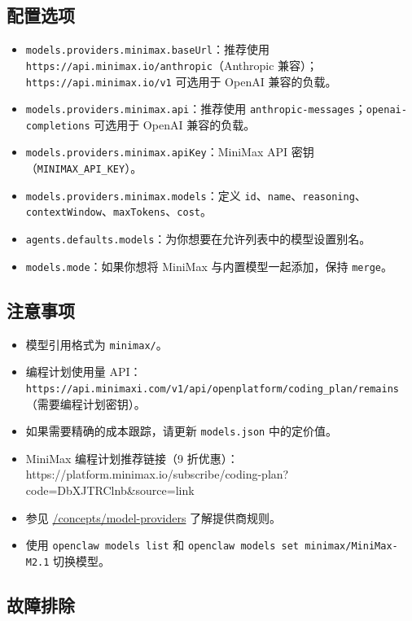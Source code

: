 \subsection{配置选项}


\begin{itemize}
  \item \texttt{models.providers.minimax.baseUrl}：推荐使用 \texttt{https://api.minimax.io/anthropic}（Anthropic 兼容）；\texttt{https://api.minimax.io/v1} 可选用于 OpenAI 兼容的负载。
  \item \texttt{models.providers.minimax.api}：推荐使用 \texttt{anthropic-messages}；\texttt{openai-completions} 可选用于 OpenAI 兼容的负载。
  \item \texttt{models.providers.minimax.apiKey}：MiniMax API 密钥（\texttt{MINIMAX\_API\_KEY}）。
  \item \texttt{models.providers.minimax.models}：定义 \texttt{id}、\texttt{name}、\texttt{reasoning}、\texttt{contextWindow}、\texttt{maxTokens}、\texttt{cost}。
  \item \texttt{agents.defaults.models}：为你想要在允许列表中的模型设置别名。
  \item \texttt{models.mode}：如果你想将 MiniMax 与内置模型一起添加，保持 \texttt{merge}。
\end{itemize}


\subsection{注意事项}


\begin{itemize}
  \item 模型引用格式为 \texttt{minimax/}。
  \item 编程计划使用量 API：\texttt{https://api.minimaxi.com/v1/api/openplatform/coding\_plan/remains}（需要编程计划密钥）。
  \item 如果需要精确的成本跟踪，请更新 \texttt{models.json} 中的定价值。
  \item MiniMax 编程计划推荐链接（9 折优惠）：https://platform.minimax.io/subscribe/coding-plan?code=DbXJTRClnb\&source=link
  \item 参见 \href{/concepts/model-providers}{/concepts/model-providers} 了解提供商规则。
  \item 使用 \texttt{openclaw models list} 和 \texttt{openclaw models set minimax/MiniMax-M2.1} 切换模型。
\end{itemize}


\subsection{故障排除}



